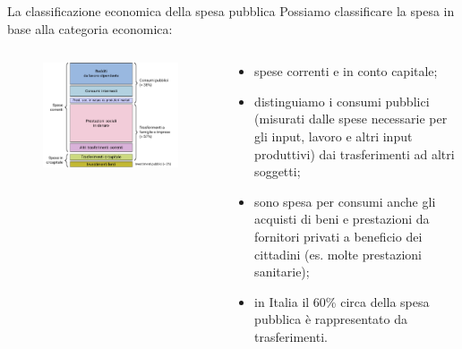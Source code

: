 \documentclass[aspectratio=64,12pt]{beamer}
\begin{document}
\begin{frame}{La classificazione economica della spesa pubblica}
Possiamo classificare la spesa in base alla categoria economica:
\begin{columns}
\begin{column}{.6\columnwidth}
\begin{figure}
\centering
\includegraphics[width=1.1\textwidth]{./figure/spesa-pubblica-classificazione-economica-color.pdf}
\end{figure}
\end{column}

\begin{column}{.4\columnwidth}
\footnotesize
\begin{itemize}
\item spese correnti e in conto capitale;
\item distinguiamo i consumi pubblici (misurati dalle spese necessarie per gli input, lavoro e altri input produttivi) dai trasferimenti ad altri soggetti;
\item sono spesa per consumi anche gli acquisti di beni e prestazioni da fornitori privati a beneficio dei cittadini (es. molte prestazioni sanitarie);
\item in Italia il 60\% circa della spesa pubblica è rappresentato da trasferimenti.
\end{itemize}
\end{column}
\end{columns}
\end{frame}
\end{document}
